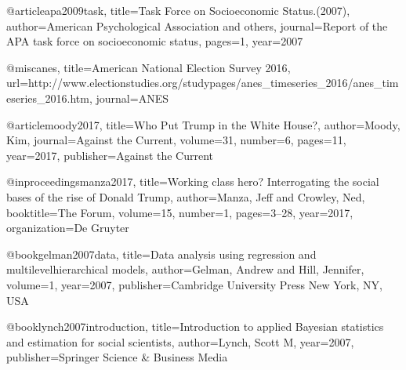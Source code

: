 @article{apa2009task,
  title={Task Force on Socioeconomic Status.(2007)},
  author={American Psychological Association and others},
  journal={Report of the APA task force on socioeconomic status},
  pages={1},
  year={2007}
}


@misc{anes, title={American National Election Survey 2016}, url={http://www.electionstudies.org/studypages/anes_timeseries_2016/anes_timeseries_2016.htm}, journal={ANES}}

@article{moody2017,
  title={Who Put Trump in the White House?},
  author={Moody, Kim},
  journal={Against the Current},
  volume={31},
  number={6},
  pages={11},
  year={2017},
  publisher={Against the Current}
}

@inproceedings{manza2017,
  title={Working class hero? Interrogating the social bases of the rise of Donald Trump},
  author={Manza, Jeff and Crowley, Ned},
  booktitle={The Forum},
  volume={15},
  number={1},
  pages={3--28},
  year={2017},
  organization={De Gruyter}
}


@book{gelman2007data,
  title={Data analysis using regression and multilevelhierarchical models},
  author={Gelman, Andrew and Hill, Jennifer},
  volume={1},
  year={2007},
  publisher={Cambridge University Press New York, NY, USA}
}

@book{lynch2007introduction,
  title={Introduction to applied Bayesian statistics and estimation for social scientists},
  author={Lynch, Scott M},
  year={2007},
  publisher={Springer Science \& Business Media}
}